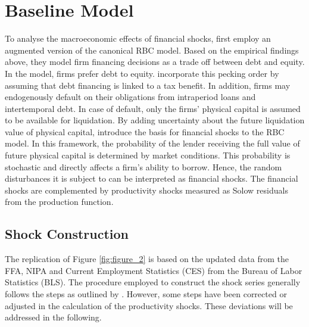 \section{Baseline Model}
\label{sec:baseline_model}

To analyse the macroeconomic effects of financial shocks, \citeauthor{JERMANNfinancial} first employ an augmented version of the canonical RBC model. Based on the empirical findings above, they model firm financing decisions as a trade off between debt and equity. In the model, firms prefer debt to equity. \citeauthor{JERMANNfinancial} incorporate this pecking order by assuming that debt financing is linked to a tax benefit. In addition, firms may endogenously default on their obligations from intraperiod loans and intertemporal debt. In case of default, only the firms' physical capital is assumed to be available for liquidation. By adding uncertainty about the future liquidation value of physical capital, \citeauthor{JERMANNfinancial} introduce the basis for financial shocks to the RBC model. In this framework, the probability of the lender receiving the full value of future physical capital is determined by market conditions. This probability is stochastic and directly affects a firm's ability to borrow. Hence, the random disturbances it is subject to can be interpreted as financial shocks. The financial shocks are complemented by productivity shocks measured as Solow residuals from the production function.


\subsection{Shock Construction}
\label{sec:shock_construction}



The replication of Figure \ref{fig:figure_2} is based on the updated data from the FFA, NIPA and Current Employment Statistics (CES) from the Bureau of Labor Statistics (BLS). The procedure employed to construct the shock series generally follows the steps as outlined by \citeauthor{JERMANNfinancial}. However, some steps have been corrected or adjusted in the calculation of the productivity shocks. These deviations will be addressed in the following. 

